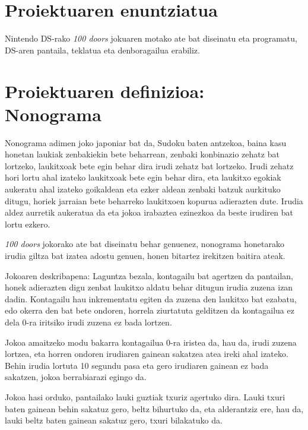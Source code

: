 \documentclass[dvipsnames]{AritzhClass}
\author{Aritz Lopez, Iñigo Arnedo eta Elena Hernández}
\begin{document}
\izenburuorrialdea

\tableofcontents

\pagebreak

\section{Proiektuaren enuntziatua}

Nintendo DS-rako \textit{100 doors} jokuaren motako ate bat diseinatu eta programatu, DS-aren pantaila, teklatua eta denboragailua erabiliz.

\section{Proiektuaren definizioa: Nonograma}

Nonograma adimen joko japoniar bat da, Sudoku baten antzekoa, baina kasu honetan laukiak zenbakiekin bete beharrean, zenbaki konbinazio zehatz bat lortzeko, laukitxoak bete egin behar dira irudi zehatz bat lortzeko. Irudi zehatz hori lortu ahal izateko laukitxoak bete egin behar dira, eta laukitxo egokiak aukeratu ahal izateko goikaldean eta ezker aldean zenbaki batzuk aurkituko ditugu, horiek jarraian bete beharreko laukitxoen kopurua adierazten dute. Irudia aldez aurretik aukeratua da eta jokoa irabaztea ezinezkoa da beste irudiren bat lortu ezkero. 

\textit{100 doors} jokorako ate bat diseinatu behar genuenez, nonograma honetarako irudia giltza bat izatea adostu genuen, honen bitartez irekitzen baitira ateak. 

Jokoaren deskribapena:
Laguntza bezala, kontagailu bat agertzen da pantailan, honek adierazten digu zenbat laukitxo aldatu behar ditugun irudia zuzena izan dadin. Kontagailu hau inkrementatu egiten da zuzena den laukitxo bat ezabatu, edo okerra den bat bete ondoren, horrela ziurtatuta gelditzen da kontagailua ez dela 0-ra iritsiko irudi zuzena ez bada lortzen. 

Jokoa amaitzeko modu bakarra kontagailua 0-ra iristea da, hau da, irudi zuzena lortzea, eta horren ondoren irudiaren gainean sakatzea atea ireki ahal izateko. Behin irudia lortuta 10 segundu pasa eta gero irudiaren gainean ez bada sakatzen, jokoa berrabiarazi egingo da.

Jokoa hasi orduko, pantailako lauki guztiak txuriz agertuko dira. Lauki txuri baten gainean behin sakatuz gero, beltz bihurtuko da, eta alderantziz ere, hau da, lauki beltz baten gainean sakatuz gero, txuri bilakatuko da. 
\end{document}
